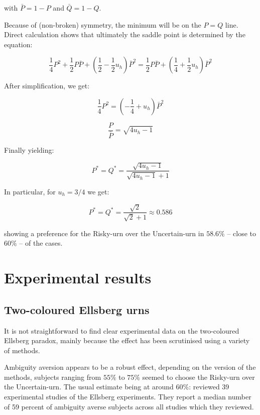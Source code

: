 \documentclass{article}
\theoremstyle{definition}
\begin{document}
with $\bar{P}=1-P$ and $\bar{Q}=1-Q$.

Because of (non-broken) symmetry, the minimum will be on the $P=Q$ line.
Direct calculation shows that ultimately the saddle point is determined by the equation:

\begin{equation}
    \frac{1}{4} P^2 + \frac{1}{2} P \bar{P} + \left ( \frac{1}{2}-\frac{1}{2} u_h \right ) \bar{P}^2
    =
    \frac{1}{2} P \bar{P} + \left ( \frac{1}{4}+\frac{1}{2} u_h \right ) \bar{P}^2
\end{equation}

After simplification, we get:

\begin{equation}
    \frac{1}{4} P^2
    =
    \left ( -\frac{1}{4} + u_h \right ) \bar{P}^2
\end{equation}

\begin{equation}
    \frac{P}{\bar{P}} = \sqrt{4 u_h -1}
\end{equation}

Finally yielding:

\begin{equation}
\boxed{
    P^* = Q^*= \frac{\sqrt{4 u_h -1}}{\sqrt{4 u_h -1}+1}
    }
\end{equation}

In particular, for $u_h=3/4$ we get:

\begin{equation}
    P^* = Q^* = \frac{\sqrt{2}}{\sqrt{2}+1} \approx 0.586
\end{equation}

showing a preference for the Risky-urn over the Uncertain-urn in $58.6\%$ -- close to $60\%$   -- of the cases.

\section{Experimental results}

\subsection{Two-coloured Ellsberg urns}

It is not straightforward to find clear experimental data on the two-coloured Ellsberg paradox, mainly because the effect has been scrutinised using a variety of methods.

Ambiguity aversion appears to be a robust effect, depending on the version of the methods, subjects ranging from $55\%$ \cite{arxiv:TwoBallEllsberg} to $75\%$ \cite{papar:SizeAmbiguity} seemed to choose the Risky-urn over the Uncertain-urn. 
The usual estimate being at around $60 \%$:
\cite{paper:AmbiguityReview} reviewed 39 experimental studies of the
Ellsberg experiments. They report a median number of 59 percent of ambiguity
averse subjects across all studies which they reviewed.
\end{document}
